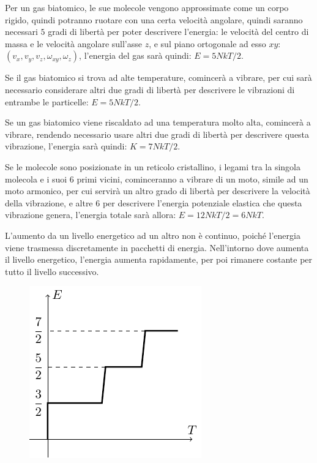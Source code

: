 \documentclass{article}
\numberwithin{equation}{subsection}
\begin{document}
Per un gas biatomico, le sue molecole vengono approssimate 
come un corpo rigido, quindi potranno ruotare con una certa 
velocità angolare, quindi saranno necessari $5$ gradi di 
libertà per poter descrivere l'energia: le velocità del 
centro di massa e le velocità angolare sull'asse $z$, e sul piano ortogonale ad esso $xy$: 
$(v_x,v_y,v_z,\omega_{xy},\omega_z)$, l'energia del gas  
sarà quindi: $E=5NkT/2$. 

Se il gas biatomico si trova ad alte temperature, comincerà a vibrare, per cui sarà necessario considerare altri due gradi di libertà per descrivere le vibrazioni di 
entrambe le particelle: $E=5NkT/2$. 



Se un gas biatomico viene riscaldato ad una temperatura molto 
alta, comincerà a vibrare, rendendo necessario usare altri due 
gradi di libertà per descrivere questa vibrazione, l'energia 
sarà quindi: $K={7}NkT/2$. 



Se le molecole sono posizionate in un reticolo cristallino, i legami tra la singola 
molecola e i suoi $6$ primi vicini, cominceranno a 
vibrare di un moto, simile ad un moto armonico, per 
cui servirà un altro grado di libertà per descrivere 
la velocità della vibrazione, e altre $6$ per descrivere 
l'energia potenziale elastica che questa vibrazione genera, 
l'energia totale sarà allora: $E=12NkT/2=6NkT$. 



L'aumento da un livello energetico ad un altro non è 
continuo, poiché l'energia viene trasmessa discretamente in 
pacchetti di energia. Nell'intorno dove aumenta il livello 
energetico, l'energia aumenta rapidamente, per poi 
rimanere costante per tutto il livello successivo. 
\begin{figure}[H]%
    \centering
    \includegraphics{energia.pdf}%
\end{figure}
\end{document}
